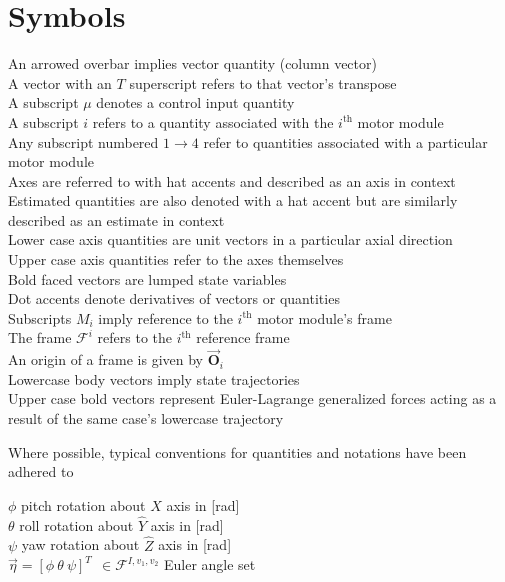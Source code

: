\documentclass[a4paper, 11pt, oneside, openright, parskip=full]{book}
\begin{document}
\chapter{Symbols}
\label{ch:symbol}
An arrowed overbar implies vector quantity (column vector)\\
A vector with an $T$ superscript refers to that vector's transpose\\
A subscript $\mu$ denotes a control input quantity\\
A subscript $i$ refers to a quantity associated with the $i^{\text{th}}$ motor module\\
Any subscript numbered $1\rightarrow 4$ refer to quantities associated with a particular motor module\\
Axes are referred to with hat accents and described as an axis in context\\
Estimated quantities are also denoted with a hat accent but are similarly described as an estimate in context\\
Lower case axis quantities are unit vectors in a particular axial direction\\
Upper case axis quantities refer to the axes themselves\\
Bold faced vectors are lumped state variables\\
Dot accents denote derivatives of vectors or quantities\\
Subscripts $M_i$ imply reference to the $i^{\text{th}}$ motor module's frame\\
The frame $\mathcal{F}^i$ refers to the $i^{\text{th}}$ reference frame\\
An origin of a frame is given by $\vec{\mathbf{O}}_i$\\
Lowercase body vectors imply state trajectories\\
Upper case bold vectors represent Euler-Lagrange generalized forces acting as a result of the same case's lowercase trajectory
\par
Where possible, typical conventions for quantities and notations have been adhered to
\par
$\phi$ pitch rotation about $\hat{X}$ axis in [rad] \\
$\theta$ roll rotation about $\hat{Y}$ axis in [rad] \\
$\psi$ yaw rotation about $\hat{Z}$ axis in [rad]\\
$\vec{\eta}=[\phi~\theta~\psi]^T~~\in\mathcal{F}^{I,v_1,v_2}$ Euler angle set\\
\end{document}

